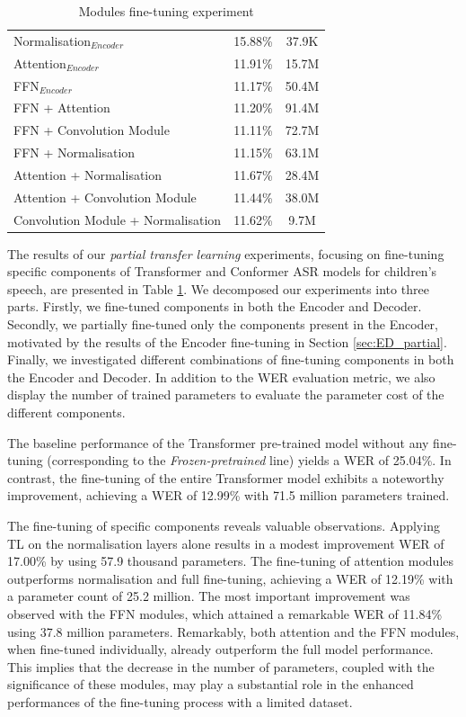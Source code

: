 \begin{table}
\begin{center}
\begin{tabular}{lcc}
            Normalisation$_{Encoder}$ & 15.88\% & 37.9K \\ 
            Attention$_{Encoder}$ & 11.91\% & 15.7M \\ 
            FFN$_{Encoder}$ & 11.17\% & 50.4M \\ \hline
            FFN + Attention & 11.20\% & 91.4M \\
            FFN + Convolution Module & 11.11\% & 72.7M \\
            FFN + Normalisation & 11.15\% & 63.1M \\
            Attention + Normalisation & 11.67\% & 28.4M \\
            Attention + Convolution Module & 11.44\% & 38.0M \\
            Convolution Module + Normalisation & 11.62\% & 9.7M\\ \hline
        \end{tabular}
    \end{center}
    \caption{Modules fine-tuning experiment}
    \label{table:ModulesTL}
\end{table}
The results of our \textit{partial transfer learning} experiments, focusing on fine-tuning specific components of Transformer and Conformer \ac{ASR} models for children's speech, are presented in Table \ref{table:ModulesTL}. We decomposed our experiments into three parts. Firstly, we fine-tuned components in both the Encoder and Decoder. Secondly, we partially fine-tuned only the components present in the Encoder, motivated by the results of the Encoder fine-tuning in Section \ref{sec:ED_partial}. Finally, we investigated different combinations of fine-tuning components in both the Encoder and Decoder. In addition to the \ac{WER} evaluation metric, we also display the number of trained parameters to evaluate the parameter cost of the different components. 

The baseline performance of the Transformer pre-trained model without any fine-tuning (corresponding to the \textit{Frozen-pretrained} line) yields a \ac{WER} of 25.04\%. In contrast, the fine-tuning of the entire Transformer model exhibits a noteworthy improvement, achieving a \ac{WER} of 12.99\% with 71.5 million parameters trained.

The fine-tuning of specific components reveals valuable observations. Applying \ac{TL} on the normalisation layers alone results in a modest improvement \ac{WER} of 17.00\% by using 57.9 thousand parameters. The fine-tuning of attention modules outperforms normalisation and full fine-tuning, achieving a \ac{WER} of 12.19\% with a parameter count of 25.2 million. The most important improvement was observed with the \ac{FFN} modules, which attained a remarkable \ac{WER} of 11.84\% using 37.8 million parameters. Remarkably, both attention and the \ac{FFN} modules, when fine-tuned individually, already outperform the full model performance. This implies that the decrease in the number of parameters, coupled with the significance of these modules, may play a substantial role in the enhanced performances of the fine-tuning process with a limited dataset.

